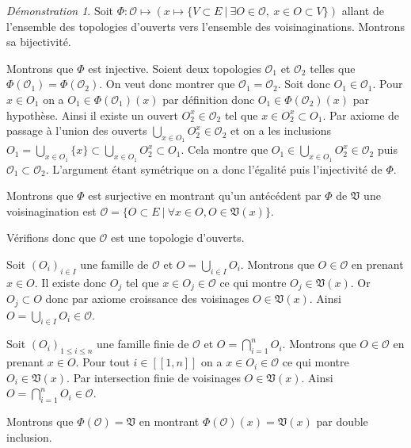 \documentclass[a4paper, 11pt, french]{book}
\newenvironment{itemise}{\itemize}{\enditemize}
\theoremstyle{plain} %
\theoremstyle{definition} %
\theoremstyle{remark} %
\newtheorem*{demonstration}{Démonstration}
\newcommand{\1}{\mathds{1}}
\renewcommand{\frak}[1]{\mathfrak{#1}}
\newcommand{\scr}[1]{\mathscr{#1}}
\newcommand\ens[2]{\{#1 \ |\ #2\}}
\begin{document}
\begin{demonstration}
	Soit $\Phi\colon\scr{O}\mapsto(x\mapsto\ens{V\subset E}{\exists O\in\scr{O},\ x\in O\subset V})$ allant de l'ensemble des topologies d'ouverts vers l'ensemble des voisinaginations.
	Montrons sa bijectivité.
	\begin{itemise}
		\item Montrons que $\Phi$ est injective.
		Soient deux topologies $\scr{O}_1$ et $\scr{O}_2$ telles que $\Phi(\scr{O}_1)=\Phi(\scr{O}_2)$.
		On veut donc montrer que $\scr{O}_1=\scr{O}_2$.
		Soit donc $O_1\in\scr{O}_1$.
		Pour $x\in O_1$ on a $O_1\in\Phi(\scr{O}_1)(x)$ par définition donc $O_1\in\Phi(\scr{O}_2)(x)$ par hypothèse.
		Ainsi il existe un ouvert $O_2^x\in\scr{O}_2$ tel que $x\in O_2^x\subset O_1$.
		Par axiome de passage à l'union des ouverts $\bigcup_{x\in O_1}O_2^x\in\scr{O}_2$ et on a les inclusions $O_1=\bigcup_{x\in O_1}\{x\}\subset\bigcup_{x\in O_1}O_2^x\subset O_1$.
		Cela montre que $O_1\in\bigcup_{x\in O_1}O_2^x\in\scr{O}_2$ puis $\scr{O}_1\subset\scr{O}_2$.
		L'argument étant symétrique on a donc l'égalité puis l'injectivité de $\Phi$.
		\item Montrons que $\Phi$ est surjective en montrant qu'un antécédent par $\Phi$ de $\frak{V}$ une voisinagination est $\scr{O}=\ens{O\subset E}{\forall x\in O, O\in\frak{V}(x)}$.
		\begin{itemise}
			\item Vérifions donc que $\scr{O}$ est une topologie d'ouverts.
			\begin{itemise}
				\item Soit $(O_i)_{i\in I}$ une famille de $\scr{O}$ et $O=\bigcup_{i\in I}O_i$.
				Montrons que $O\in\scr{O}$ en prenant $x\in O$.
				Il existe donc $O_j$ tel que $x\in O_j\in\scr{O}$ ce qui montre $O_j\in\frak{V}(x)$.
				Or $O_j\subset O$ donc par axiome croissance des voisinages $O\in\frak{V}(x)$.
				Ainsi $O=\bigcup_{i\in I}O_i\in\scr{O}$.
				\item Soit $(O_i)_{1\leqslant i\leqslant n}$ une famille finie de $\scr{O}$ et $O=\bigcap_{i=1}^nO_i$.
				Montrons que $O\in\scr{O}$ en prenant $x\in O$.
				Pour tout $i\in[\![1, n]\!]$ on a $x\in O_i\in\scr{O}$ ce qui montre $O_i\in\frak{V}(x)$.
				Par intersection finie de voisinages $O\in\frak{V}(x)$.
				Ainsi $O=\bigcap_{i=1}^nO_i\in\scr{O}$.
			\end{itemise}
			\item Montrons que $\Phi(\scr{O})=\frak{V}$ en montrant $\Phi(\scr{O})(x)=\frak{V}(x)$ par double inclusion.
			\begin{itemise}

\end{itemise}
\end{itemise}
\end{itemise}
\end{demonstration}
\end{document}
